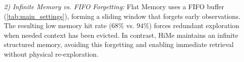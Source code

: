 \textit{2) Infinite Memory vs. FIFO Forgetting:}
Flat Memory uses a FIFO buffer (\autoref{tab:main_settings}), forming a sliding window that forgets early observations. The resulting low memory hit rate ($68\%$ vs. $94\%$) forces redundant exploration when needed context has been evicted. In contrast, HiMe maintains an infinite structured memory, avoiding this forgetting and enabling immediate retrieval without physical re-exploration.








